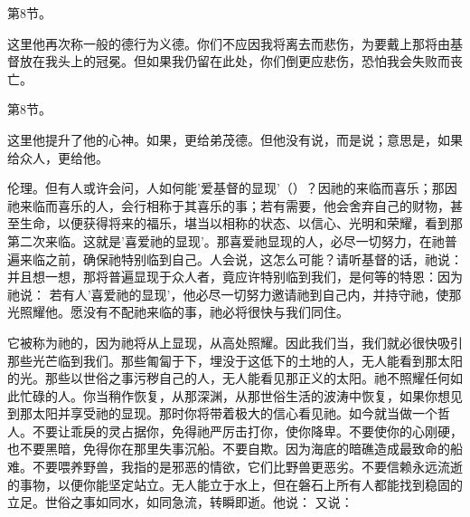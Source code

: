 第8节。\par

这里他再次称一般的德行为义德。你们不应因我将离去而悲伤，为要戴上那将由基督放在我头上的冠冕。但如果我仍留在此处，你们倒更应悲伤，恐怕我会失败而丧亡。\par

第8节。\par

这里他提升了他的心神。如果，更给弟茂德。但他没有说，而是说；意思是，如果给众人，更给他。\par

伦理。但有人或许会问，人如何能'爱基督的显现'（）？因祂的来临而喜乐；那因祂来临而喜乐的人，会行相称于其喜乐的事；若有需要，他会舍弃自己的财物，甚至生命，以便获得将来的福乐，堪当以相称的状态、以信心、光明和荣耀，看到那第二次来临。这就是'喜爱祂的显现'。那喜爱祂显现的人，必尽一切努力，在祂普遍来临之前，确保祂特别临到自己。人会说，这怎么可能？请听基督的话，祂说： 并且想一想，那将普遍显现于众人者，竟应许特别临到我们，是何等的特恩：因为祂说： 若有人'喜爱祂的显现'，他必尽一切努力邀请祂到自己内，并持守祂，使那光照耀他。愿没有不配祂来临的事，祂必将很快与我们同住。\par

它被称为祂的，因为祂将从上显现，从高处照耀。因此我们当，我们就必很快吸引那些光芒临到我们。那些匍匐于下，埋没于这低下的土地的人，无人能看到那太阳的光。那些以世俗之事污秽自己的人，无人能看见那正义的太阳。祂不照耀任何如此忙碌的人。你当稍作恢复，从那深渊，从那世俗生活的波涛中恢复，如果你想见到那太阳并享受祂的显现。那时你将带着极大的信心看见祂。如今就当做一个哲人。不要让乖戾的灵占据你，免得祂严厉击打你，使你降卑。不要使你的心刚硬，也不要黑暗，免得你在那里失事沉船。不要自欺。因为海底的暗礁造成最致命的船难。不要喂养野兽，我指的是邪恶的情欲，它们比野兽更恶劣。不要信赖永远流逝的事物，以便你能坚定站立。无人能立于水上，但在磐石上所有人都能找到稳固的立足。世俗之事如同水，如同急流，转瞬即逝。他说： 又说：\par

